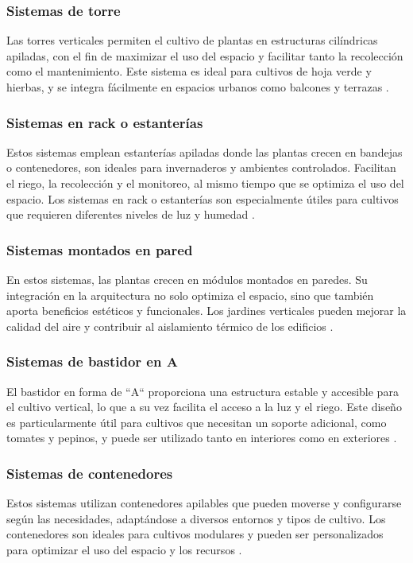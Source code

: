 \subsubsection{Sistemas de torre}
Las torres verticales permiten el cultivo de plantas en estructuras cilíndricas apiladas, con el fin de maximizar el uso del espacio y facilitar tanto la recolección como el mantenimiento. Este sistema es ideal para cultivos de hoja verde y hierbas, y se integra fácilmente en espacios urbanos como balcones y terrazas \cite{CULTIVOS:TIPOS}.

\subsubsection{Sistemas en rack o estanterías}
Estos sistemas emplean estanterías apiladas donde las plantas crecen en bandejas o contenedores, son ideales para invernaderos y ambientes controlados. Facilitan el riego, la recolección y el monitoreo, al mismo tiempo que se optimiza el uso del espacio.
Los sistemas en rack o estanterías son especialmente útiles para cultivos que requieren diferentes niveles de luz y humedad \cite{CULTIVOS:TIPOS}.

\subsubsection{Sistemas montados en pared}
En estos sistemas, las plantas crecen en módulos montados en paredes. Su integración en la arquitectura no solo optimiza el espacio, sino que también aporta beneficios estéticos y funcionales.
Los jardines verticales pueden mejorar la calidad del aire y contribuir al aislamiento térmico de los edificios \cite{CULTIVOS:TIPOS}.

\subsubsection{Sistemas de bastidor en A}
El bastidor en forma de ``A`` proporciona una estructura estable y accesible para el cultivo vertical, lo que a su vez facilita el acceso a la luz y el riego.
Este diseño es particularmente útil para cultivos que necesitan un soporte adicional, como tomates y pepinos, y puede ser utilizado tanto en interiores como en exteriores \cite{CULTIVOS:TIPOS}.

\subsubsection{Sistemas de contenedores}
Estos sistemas utilizan contenedores apilables que pueden moverse y configurarse según las necesidades, adaptándose a diversos entornos y tipos de cultivo.
Los contenedores son ideales para cultivos modulares y pueden ser personalizados para optimizar el uso del espacio y los recursos \cite{CULTIVOS:TIPOS}.


